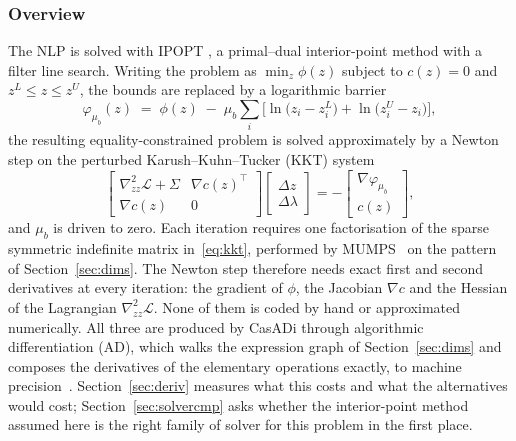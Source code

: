 \documentclass[11pt,a4paper]{article}
\begin{document}
\subsubsection{Overview}
\label{sec:solveroverview}

The NLP is solved with IPOPT \cite{wachter2006ipopt}, a primal--dual interior-point method with a filter
line search. Writing the problem as $\min_z \phi(z)$ subject to $c(z)=0$ and $z^L\le z\le z^U$, the bounds
are replaced by a logarithmic barrier
\begin{equation}
  \varphi_{\mu_b}(z) \;=\; \phi(z) \;-\; \mu_b\sum_i\Big[\ln\!\big(z_i-z_i^L\big)+\ln\!\big(z_i^U-z_i\big)\Big],
  \label{eq:ipopt}
\end{equation}
the resulting equality-constrained problem is solved approximately by a Newton step on the perturbed Karush--Kuhn--Tucker (KKT)
system
\begin{equation}
  \begin{bmatrix}
    \nabla^2_{zz}\mathcal{L} + \Sigma & \nabla c(z)^{\!\top}\\
    \nabla c(z) & 0
  \end{bmatrix}
  \begin{bmatrix}\Delta z\\ \Delta\lambda\end{bmatrix}
  = -\begin{bmatrix}\nabla\varphi_{\mu_b}\\ c(z)\end{bmatrix},
  \label{eq:kkt}
\end{equation}
and $\mu_b$ is driven to zero. Each iteration requires one factorisation of the sparse symmetric indefinite
matrix in~\eqref{eq:kkt}, performed by MUMPS~\cite{amestoy2001mumps} on the pattern of Section~\ref{sec:dims}.
The Newton step therefore needs exact first and second derivatives at every iteration: the gradient
of $\phi$, the Jacobian $\nabla c$ and the Hessian of the Lagrangian $\nabla^2_{zz}\mathcal{L}$.
None of them is coded by hand or approximated numerically. All three are produced by CasADi through
algorithmic differentiation (AD), which walks the expression graph of Section~\ref{sec:dims} and
composes the derivatives of the elementary operations exactly, to machine precision~\cite{griewank2008ad}.
Section~\ref{sec:deriv} measures what this costs and what the alternatives would cost;
Section~\ref{sec:solvercmp} asks whether the interior-point method assumed here is the right family
of solver for this problem in the first place.
\end{document}

